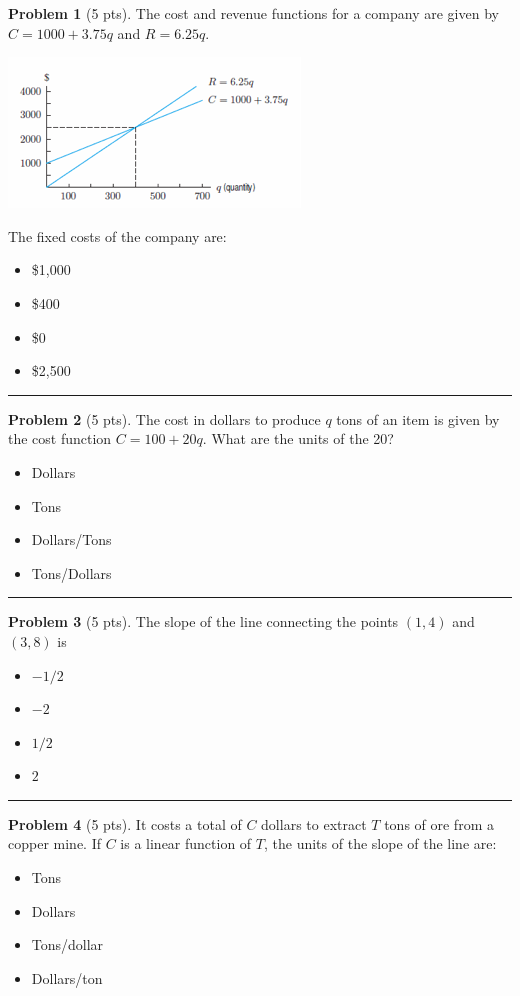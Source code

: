 \documentclass[12pt]{article}
\makeatletter
\theoremstyle{definition}
\newtheorem{problem}{Problem}
\newcommand*{\radiobutton}{%
  \@ifstar{\@radiobutton0}{\@radiobutton1}%
}
\newcommand*{\@radiobutton}[1]{%
  \begin{tikzpicture}
    \pgfmathsetlengthmacro\radius{height("X")/2}
    \draw[radius=\radius] circle;
    \ifcase#1 \fill[radius=.6*\radius] circle;\fi
  \end{tikzpicture}%
}
\makeatother
\begin{document}
\bigskip
\begin{problem}[5 pts]
  The cost and revenue functions for a company are given by $C = 1000 + 3.75q$ and $R = 6.25q$.
  \begin{center}
    \includegraphics{1graph1.png}
  \end{center}
  The fixed costs of the company are:
  \begin{itemize}
  \item[\radiobutton] \$1,000 
  \item[\radiobutton] \$400
  \item[\radiobutton] \$0
  \item[\radiobutton] \$2,500
  \end{itemize}
\end{problem}
\hrule

\begin{problem}[5 pts]
  The cost in dollars to produce $q$ tons of an item is given by the cost function $C = 100 + 20q$. What are the units of
  the 20? 
  \begin{itemize}
  \item[\radiobutton] Dollars
  \item[\radiobutton] Tons
  \item[\radiobutton] Dollars/Tons
  \item[\radiobutton] Tons/Dollars
  \end{itemize} 
\end{problem}
\hrule

\begin{problem}[5 pts]
  The slope of the line connecting the points $(1, 4)$ and $(3, 8)$ is
  \begin{itemize}
  \item[\radiobutton] $-1/2$
  \item[\radiobutton] $-2$
  \item[\radiobutton] $1/2$
  \item[\radiobutton] $2$
  \end{itemize}
\end{problem}
\hrule

\begin{problem}[5 pts]
  It costs a total of $C$ dollars to extract $T$ tons of ore from a copper mine. If $C$ is a linear function of $T$, the
  units of the slope of the line are: 
  \begin{itemize}
  \item[\radiobutton] Tons
  \item[\radiobutton] Dollars
  \item[\radiobutton] Tons/dollar
  \item[\radiobutton] Dollars/ton
  \end{itemize}
\end{problem}
\end{document}
